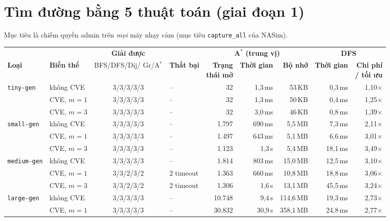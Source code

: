 \documentclass[11pt,a4paper]{article}
\begin{document}
\section{Tìm đường bằng 5 thuật toán (giai đoạn 1)}

Mục tiêu là chiếm quyền admin trên \emph{mọi} máy nhạy cảm (mục tiêu \texttt{capture\_all} của NASim).

\begin{center}
\footnotesize
\begin{tabular}{@{}llcl rrr rr@{}}
\toprule
& & \textbf{Giải được} & & \multicolumn{3}{c}{\textbf{A$^{*}$ (trung vị)}} & \multicolumn{2}{c}{\textbf{DFS}} \\
\cmidrule(lr){5-7}\cmidrule(lr){8-9}
\textbf{Loại} & \textbf{Biến thể} & \shortstack{BFS/DFS/Dij/\\Gr/A$^{*}$} & \textbf{Thất bại} & \shortstack{\textbf{Trạng}\\\textbf{thái mở}} & \textbf{Thời gian} & \textbf{Bộ nhớ} & \textbf{Thời gian} & \shortstack{\textbf{Chi phí}\\\textbf{/ tối ưu}} \\
\midrule
\texttt{tiny-gen} & không CVE & 3/3/3/3/3 & -- & 32 & 1{,}3\,ms & 53\,KB & 0{,}3\,ms & 1{,}10$\times$ \\
 & CVE, $m{=}1$ & 3/3/3/3/3 & -- & 32 & 1{,}3\,ms & 50\,KB & 0{,}4\,ms & 1{,}25$\times$ \\
 & CVE, $m{=}3$ & 3/3/3/3/3 & -- & 32 & 3{,}0\,ms & 46\,KB & 0{,}8\,ms & 1{,}39$\times$ \\
\texttt{small-gen} & không CVE & 3/3/3/3/3 & -- & 1.797 & 690\,ms & 5{,}5\,MB & 7{,}3\,ms & 2{,}11$\times$ \\
 & CVE, $m{=}1$ & 3/3/3/3/3 & -- & 1.497 & 643\,ms & 5{,}1\,MB & 6{,}6\,ms & 3{,}01$\times$ \\
 & CVE, $m{=}3$ & 3/3/3/3/3 & -- & 1.123 & 1{,}3\,s & 5{,}4\,MB & 18{,}1\,ms & 3{,}49$\times$ \\
\texttt{medium-gen} & không CVE & 3/3/3/3/3 & -- & 1.814 & 803\,ms & 15{,}0\,MB & 12{,}5\,ms & 3{,}10$\times$ \\
 & CVE, $m{=}1$ & 3/3/2/3/2 & 2 timeout & 1.363 & 660\,ms & 10{,}8\,MB & 18{,}8\,ms & 3{,}06$\times$ \\
 & CVE, $m{=}3$ & 3/3/2/3/2 & 2 timeout & 1.306 & 1{,}6\,s & 13{,}1\,MB & 45{,}5\,ms & 3{,}24$\times$ \\
\texttt{large-gen} & không CVE & 3/3/3/3/3 & -- & 10.748 & 9{,}4\,s & 114{,}6\,MB & 19{,}3\,ms & 2{,}73$\times$ \\
 & CVE, $m{=}1$ & 3/3/3/3/3 & -- & 30.832 & 30{,}9\,s & 358{,}1\,MB & 24{,}8\,ms & 2{,}77$\times$ \\

\end{tabular}
\end{center}
\end{document}
